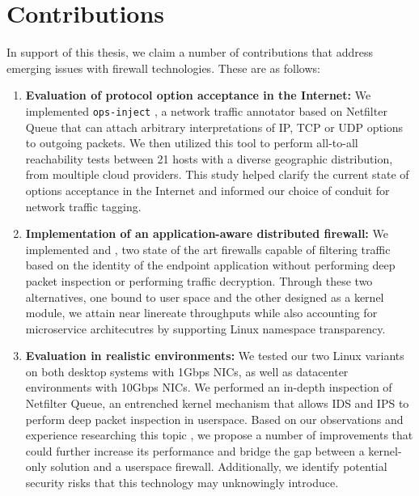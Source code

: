 \section{Contributions}
\label{conclusion:contrib}

In support of this thesis, we claim a number of contributions that address
emerging issues with firewall technologies. These are as follows:

\begin{enumerate}
    \item \textbf{Evaluation of protocol option acceptance in the Internet:}
    We implemented \texttt{ops-inject} \cite{mantu2024framework}, a network
    traffic annotator based on Netfilter Queue that can attach arbitrary
    interpretations of IP, TCP or UDP options to outgoing packets. We then
    utilized this tool to perform all-to-all reachability tests between 21
    hosts with a diverse geographic distribution, from moultiple cloud providers.
    This study helped clarify the current state of options acceptance in the
    Internet and informed our choice of conduit for network traffic tagging.

    \item \textbf{Implementation of an application-aware distributed firewall:}
    We implemented \daf{} \cite{mantu2024process} and \scout{},
    two state of the art firewalls capable of filtering traffic based on the
    identity of the endpoint application without performing deep packet inspection
    or performing traffic decryption. Through these two alternatives, one
    bound to user space and the other designed as a kernel module, we attain near
    linereate throughputs while also accounting for microservice architecutres
    by supporting Linux namespace transparency.

    \item \textbf{Evaluation in realistic environments:} We tested our two Linux
    variants on both desktop systems with 1Gbps NICs, as well as datacenter
    environments with 10Gbps NICs. We performed an in-depth inspection of Netfilter
    Queue, an entrenched kernel mechanism that allows IDS and IPS to perform
    deep packet inspection in userspace. Based on our observations and experience
    researching this topic \cite{gherghescu2024ve}, we propose a number of
    improvements that could further increase its performance and bridge the gap
    between a kernel-only solution and a userspace firewall. Additionally, we
    identify potential security risks that this technology may unknowingly introduce.


\end{enumerate}
